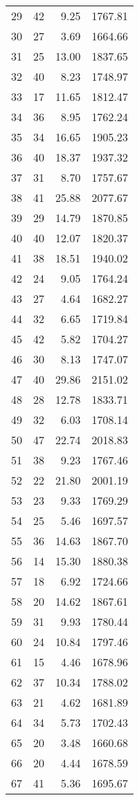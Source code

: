 \begin{appendix}
\begin{compacttable}
\begin{longtable}{@{}rrrr@{}}
29 & 42 & 9.25 & 1767.81 \\
30 & 27 & 3.69 & 1664.66 \\
31 & 25 & 13.00 & 1837.65 \\
32 & 40 & 8.23 & 1748.97 \\
33 & 17 & 11.65 & 1812.47 \\
34 & 36 & 8.95 & 1762.24 \\
35 & 34 & 16.65 & 1905.23 \\
36 & 40 & 18.37 & 1937.32 \\
37 & 31 & 8.70 & 1757.67 \\
38 & 41 & 25.88 & 2077.67 \\
39 & 29 & 14.79 & 1870.85 \\
40 & 40 & 12.07 & 1820.37 \\
41 & 38 & 18.51 & 1940.02 \\
42 & 24 & 9.05 & 1764.24 \\
43 & 27 & 4.64 & 1682.27 \\
44 & 32 & 6.65 & 1719.84 \\
45 & 42 & 5.82 & 1704.27 \\
46 & 30 & 8.13 & 1747.07 \\
47 & 40 & 29.86 & 2151.02 \\
48 & 28 & 12.78 & 1833.71 \\
49 & 32 & 6.03 & 1708.14 \\
50 & 47 & 22.74 & 2018.83 \\
51 & 38 & 9.23 & 1767.46 \\
52 & 22 & 21.80 & 2001.19 \\
53 & 23 & 9.33 & 1769.29 \\
54 & 25 & 5.46 & 1697.57 \\
55 & 36 & 14.63 & 1867.70 \\
56 & 14 & 15.30 & 1880.38 \\
57 & 18 & 6.92 & 1724.66 \\
58 & 20 & 14.62 & 1867.61 \\
59 & 31 & 9.93 & 1780.44 \\
60 & 24 & 10.84 & 1797.46 \\
61 & 15 & 4.46 & 1678.96 \\
62 & 37 & 10.34 & 1788.02 \\
63 & 21 & 4.62 & 1681.89 \\
64 & 34 & 5.73 & 1702.43 \\
65 & 20 & 3.48 & 1660.68 \\
66 & 20 & 4.44 & 1678.59 \\
67 & 41 & 5.36 & 1695.67 \\
\end{longtable}
\end{compacttable}

\end{appendix}
